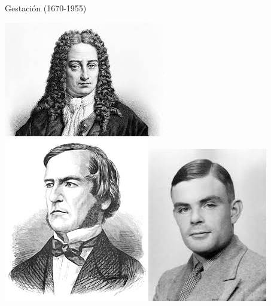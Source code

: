 \documentclass[11pt]{beamer}
\begin{document}
\begin{frame}{Gestación (1670-1955)}

\includegraphics[scale=.45]{imagenes/Leibniz}\hspace{0.8cm}\includegraphics[scale=.3]{imagenes/Boole}\hspace{0.8cm}\includegraphics[scale=.35]{imagenes/turing}

\end{frame}
\end{document}
